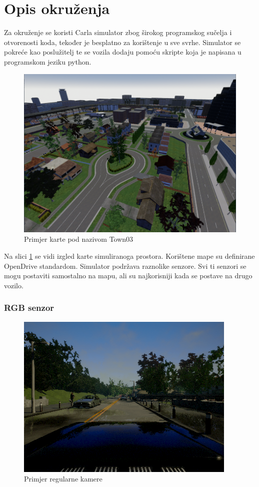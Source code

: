 \section{Opis okruženja}

Za okruženje se koristi Carla simulator zbog širokog programskog sučelja i otvorenosti koda, tekođer je besplatno za korištenje u sve svrhe. Simulator se pokreće kao poslužitelj te se vozila dodaju pomoću skripte koja je napisana u programskom jeziku python.

\begin{figure}[ht!]
  \centering
  \includegraphics[scale=0.5]{images/carla_town03_example.png}
  \caption{Primjer karte pod nazivom Town03}
  \label{fig:town03_exmaple}
\end{figure}

Na slici \ref{fig:town03_exmaple} se vidi izgled karte simuliranoga prostora. Korištene mape su definirane OpenDrive standardom. Simulator podržava raznolike senzore. Svi ti senzori se mogu postaviti samostalno na mapu, ali su najkorisniji kada se postave na drugo vozilo.

\newpage
\subsubsection{RGB senzor}
\begin{figure}[ht!]
  \centering
  \includegraphics[scale=0.5]{images/rgb_example.png}
  \caption{Primjer regularne kamere\cite{carla:sensors}}
  \label{fig:rgb_exmaple}
\end{figure}


